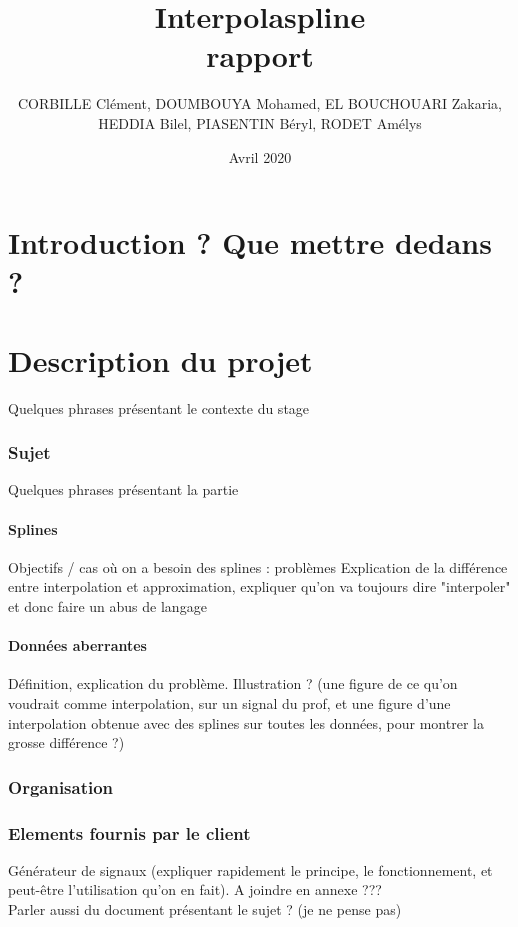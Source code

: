 \documentclass[a4paper,12pt]{article} %
\title{\textbf{Interpolaspline}\\ rapport}
\author{CORBILLE Clément, DOUMBOUYA Mohamed, EL BOUCHOUARI Zakaria, \\HEDDIA Bilel, PIASENTIN Béryl, RODET Amélys }
\date{Avril 2020}
\begin{document}
\maketitle
\tableofcontents

\renewcommand\partname{}
\part{Introduction ? Que mettre dedans ?}



\renewcommand\partname{}
\part{Description du projet}
	Quelques phrases présentant le contexte du stage
	\section{Sujet}
		Quelques phrases présentant la partie
		\subsection{Splines}
			 Objectifs / cas où on a besoin des splines : problèmes
			Explication de la différence entre interpolation et approximation, expliquer qu'on va toujours dire "interpoler" et donc faire un abus de langage
		\subsection{Données aberrantes}
			Définition, explication du problème. Illustration ? (une figure de ce qu'on voudrait comme interpolation, sur un signal du prof, et une figure d'une interpolation obtenue avec des splines sur toutes les données, pour montrer la grosse différence ?)
	\section{Organisation}
	\section{Elements fournis par le client}
		Générateur de signaux (expliquer rapidement le principe, le fonctionnement, et peut-être l'utilisation qu'on en fait). A joindre en annexe ???
		\\Parler aussi du document présentant le sujet ? (je ne pense pas)



\renewcommand\partname{}
\end{document}
